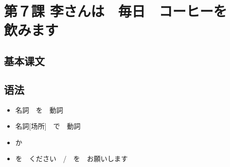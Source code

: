\section{第７課 李さんは　毎日　コーヒーを　飲みます}

\subsection{基本课文}


\subsection{语法}

\begin{itemize}
    \item 名詞　を　動詞
    \item 名詞[场所]　で　動詞
    \item か
    \item を　ください　/　を　お願いします
\end{itemize}

